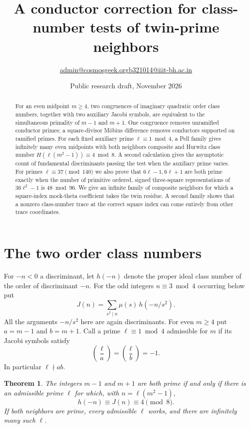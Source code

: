 \documentclass[11pt]{article}
\title{A conductor correction for class-number tests of twin-prime neighbors}
\author{\small \href{mailto:admin@cosmosgeek.org}{admin@cosmosgeek.org}\qquad \href{mailto:b321014@iiit-bh.ac.in}{b321014@iiit-bh.ac.in}}
\date{Public research draft, November 2026}
\newtheorem{theorem}{Theorem}
\newcommand{\leg}[2]{\left(\frac{#1}{#2}\right)}
\begin{document}
\maketitle
\begin{abstract}
For an even midpoint $m\ge4$, two congruences of imaginary quadratic
order class numbers, together with two auxiliary Jacobi symbols, are
equivalent to the simultaneous primality of $m-1$ and $m+1$. One
congruence removes unramified conductor primes; a square-divisor
M\"obius difference removes conductors supported on ramified primes.
For each fixed auxiliary prime $\ell\equiv1\bmod4$, a Pell family gives
infinitely many even midpoints with both neighbors composite and
Hurwitz class number $H(\ell(m^2-1))\equiv4\bmod8$.
A second calculation gives the asymptotic count of fundamental
discriminants passing the test when the auxiliary prime varies.
For primes $\ell\equiv37\pmod {140}$ we also prove that
$6\ell-1,6\ell+1$ are both prime exactly when the number of primitive
ordered, signed three-square representations of $36\ell^2-1$ is
$48\bmod96$. We give an infinite family of composite neighbors for
which a square-index mock-theta coefficient takes the twin residue.
A second family shows that a nonzero class-number trace at the
correct square index can come entirely from other trace coordinates.
\end{abstract}

\section{The two order class numbers}
For $-n<0$ a discriminant, let $h(-n)$ denote the proper ideal class
number of the order of discriminant $-n$. For the odd integers
$n\equiv3\bmod4$ occurring below put
\[
 J(n)=\sum_{s^2\mid n}\mu(s)\,h(-n/s^2).
\]
All the arguments $-n/s^2$ here are again discriminants.
For even $m\ge4$ put $a=m-1$ and $b=m+1$. Call a prime
$\ell\equiv1\bmod4$ admissible for $m$ if its Jacobi symbols satisfy
\[
             \leg{\ell}{a}=\leg{\ell}{b}=-1 .
\]
In particular $\ell\nmid ab$.

\begin{theorem}\label{th:main}
The integers $m-1$ and $m+1$ are both prime if and only if there
is an admissible prime $\ell$ for which, with $n=\ell(m^2-1)$,
\[
                  h(-n)\equiv J(n)\equiv4\pmod8.
\]
If both neighbors are prime, every admissible $\ell$ works, and there
are infinitely many such $\ell$.
\end{theorem}
\end{document}
